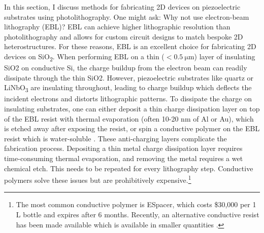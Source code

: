 \documentclass{beavtex_dub_edit}
\begin{document}
In this section, I discuss methods for fabricating 2D devices on piezoelectric substrates using photolithography. One might ask: Why not use electron-beam lithography (EBL)? EBL can achieve higher lithographic resolution than photolithography and allows for custom circuit designs to match bespoke 2D heterostructures. For these reasons, EBL is an excellent choice for fabricating 2D devices on SiO\textsubscript{2}. When performing EBL on a thin ($< \SI{0.5}{\micro\meter}$) layer of insulating SiO2 on conductive Si, the charge buildup from the electron beam can readily dissipate through the thin SiO2. However, piezoelectric substrates like quartz or LiNbO\textsubscript{3} are insulating throughout, leading to charge buildup which deflects the incident electrons and distorts lithographic patterns. To dissipate the charge on insulating substrates, one can either deposit a thin charge dissipation layer on top of the EBL resist with thermal evaporation (often 10-20 nm of Al or Au), which is etched away after exposing the resist, or spin a conductive polymer on the EBL resist which is water-soluble \cite{noauthor_nanolithography_nodate}. These anti-charging layers complicate the fabrication process. Depositing a thin metal charge dissipation layer requires time-consuming thermal evaporation, and removing the metal requires a wet chemical etch. This needs to be repeated for every lithography step. Conductive polymers solve these issues but are prohibitively expensive.\footnote{The most common conductive polymer is ESpacer, which costs \$30,000 per 1 L bottle and expires after 6 months. Recently, an alternative conductive resist has been made available which is available in smaller quantities \cite{lopez_charge_2019}.}  
\end{document}
